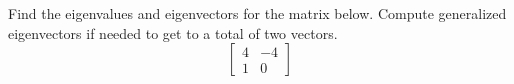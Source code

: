 \begin{exercise}\ansMark%
Find the eigenvalues and eigenvectors for the matrix below. Compute generalized eigenvectors if needed to get to a total of two vectors. 
\[ \begin{bmatrix} 4 & -4 \\ 1 & 0 \end{bmatrix} \]
\end{exercise}

